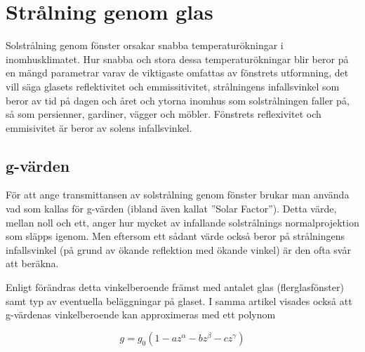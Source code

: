 \section{Strålning genom glas}
\label{sec:sunthroughwindows}
Solstrålning genom fönster orsakar snabba temperaturökningar i inomhusklimatet. Hur snabba och stora dessa temperaturökningar blir beror på en mängd parametrar varav de viktigaste omfattas av fönstrets utformning, det vill säga glasets reflektivitet och emmissitivitet, strålningens infallsvinkel som beror av tid på dagen och året och ytorna inomhus som solstrålningen faller på, så som persienner, gardiner, vägger och möbler. Fönstrets reflexivitet och emmisivitet är beror av solens infallsvinkel.


\subsection{g-värden}\label{gvalue}

För att ange transmittansen av solstrålning genom fönster brukar man använda vad som kallas för g-värden (ibland även kallat ''Solar Factor''). Detta värde, mellan noll och ett, anger hur mycket av infallande solstrålnings normalprojektion som släpps igenom. Men eftersom ett sådant värde också beror på strålningens infallsvinkel (på grund av ökande reflektion med ökande vinkel) är den ofta svår att beräkna.

Enligt \cite{karlssonroos99} förändras detta vinkelberoende främst med antalet glas (flerglasfönster) samt typ av eventuella beläggningar på glaset. I samma artikel visades också att g-värdenas vinkelberoende kan approximeras med ett polynom

\begin{equation}\label{eq:radiationwindowstheory:gvalue}
g = g_0 \left( 1 - az^{\alpha} - bz^{\beta} - cz^{\gamma} \right)
\end{equation}

